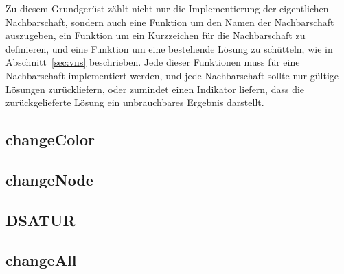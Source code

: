 Zu diesem Grundgerüst zählt nicht nur die Implementierung der eigentlichen Nachbarschaft, sondern auch eine Funktion um den Namen der Nachbarschaft auszugeben, ein Funktion um ein Kurzzeichen für die Nachbarschaft
zu definieren, und eine Funktion um eine bestehende Lösung zu schütteln, wie in Abschnitt~\ref{sec:vns} beschrieben. Jede dieser Funktionen muss für eine Nachbarschaft implementiert werden, und jede Nachbarschaft
sollte nur gültige Lösungen zurückliefern, oder zumindet einen Indikator liefern, dass die zurückgelieferte Lösung ein unbrauchbares Ergebnis darstellt.

\subsection{changeColor}
\subsection{changeNode}
\subsection{DSATUR}
\subsection{changeAll}


 
